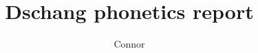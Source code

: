 \documentclass[]{article}
\title{Dschang phonetics report}
\author{Connor}
\date{\vspace{-3em}}
\begin{document}
\maketitle

\begin{abstract}

\end{abstract}

\section{}
\end{document}
